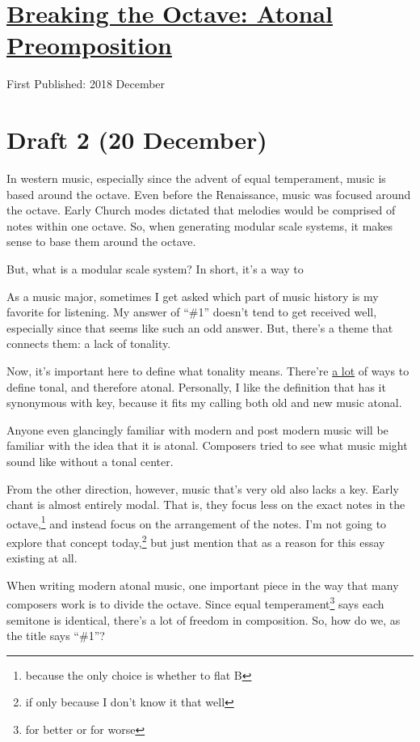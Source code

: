 \documentclass[12pt]{article}[titlepage]
\newcommand{\say}[1]{``\#1''}
\newcommand{\1}{\={a}}
\newcommand{\2}{\={e}}
\newcommand{\3}{\={\i}}
\newcommand{\4}{\=o}
\newcommand{\5}{\=u}
\newcommand{\6}{\={A}}
\renewcommand{\,}{\textsuperscript{,}}
\begin{document}
\doublespacing
\section{\href{atonal-precomposition.html}{Breaking the Octave: Atonal Preomposition}}
First Published: 2018 December
\section{Draft 2 (20 December)}
In western music, especially since the advent of equal temperament, music is based around the octave.
Even before the Renaissance, music was focused around the octave.
Early Church modes dictated that melodies would be comprised of notes within one octave.
So, when generating modular scale systems, it makes sense to base them around the octave.

But, what is a modular scale system?
In short, it's a way to 



As a music major, sometimes I get asked which part of music history is my favorite for listening.
My answer of \say{everything that's before Baroque or after Romantic} doesn't tend to get received well, especially since that seems like such an odd answer.
But, there's a theme that connects them: a lack of tonality.

Now, it's important here to define what tonality means.
There're \href{https://en.wikipedia.org/wiki/Tonality}{a lot} of ways to define tonal, and therefore atonal.
Personally, I like the definition that has it synonymous with key, because it fits my calling both old and new music atonal.

Anyone even glancingly familiar with modern and post modern music will be familiar with the idea that it is atonal.
Composers tried to see what music might sound like without a tonal center.

From the other direction, however, music that's very old also lacks a key.
Early chant is almost entirely modal.
That is, they focus less on the exact notes in the octave,\footnote{because the only choice is whether to flat B} and instead focus on the arrangement of the notes.
I'm not going to explore that concept today,\footnote{if only because I don't know it that well} but just mention that as a reason for this essay existing at all.

When writing modern atonal music, one important piece in the way that many composers work is to divide the octave.
Since equal temperament\footnote{for better or for worse} says each semitone is identical, there's a lot of freedom in composition.
So, how do we, as the title says \say{Break the Octave}?
\end{document}
